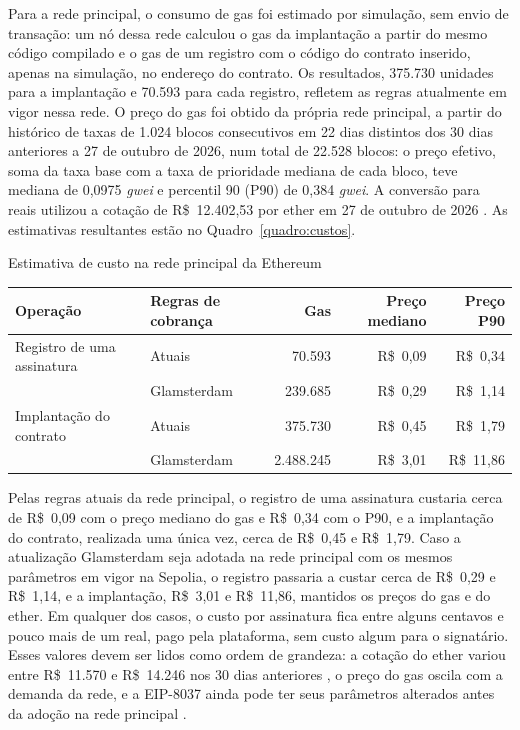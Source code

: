 \documentclass[
    12pt,
    a4paper,
    oneside,
    chapter=TITLE,
    section=TITLE,
    subsection=TITLE,
    subsubsection=TITLE,
    sumario=tradicional,
    english,
    brazil
]{abntex2}
\begin{document}
Para a rede principal, o consumo de gas foi estimado por simulação, sem envio de transação: um nó dessa rede calculou o gas da implantação a partir do mesmo código compilado e o gas de um registro com o código do contrato inserido, apenas na simulação, no endereço do contrato. Os resultados, 375.730 unidades para a implantação e 70.593 para cada registro, refletem as regras atualmente em vigor nessa rede. O preço do gas foi obtido da própria rede principal, a partir do histórico de taxas de 1.024 blocos consecutivos em 22 dias distintos dos 30 dias anteriores a 27 de outubro de 2026, num total de 22.528 blocos: o preço efetivo, soma da taxa base com a taxa de prioridade mediana de cada bloco, teve mediana de 0,0975 \emph{gwei} e percentil 90 (P90) de 0,384 \emph{gwei}. A conversão para reais utilizou a cotação de R\$~12.402,53 por ether em 27 de outubro de 2026 \cite{coingecko2026}. As estimativas resultantes estão no Quadro~\ref{quadro:custos}.

\begin{quadro}[htb]
    \caption{Estimativa de custo na rede principal da Ethereum}
    \label{quadro:custos}
    \centering
    \small
    \begin{tabular}{L{3.6cm}L{2.6cm}rrr}
        \toprule
        \textbf{Operação} & \textbf{Regras de cobrança} & \textbf{Gas} & \textbf{Preço mediano} & \textbf{Preço P90} \\
        \midrule
        Registro de uma assinatura & Atuais & 70.593 & R\$~0,09 & R\$~0,34 \\
         & Glamsterdam & 239.685 & R\$~0,29 & R\$~1,14 \\
        \midrule
        Implantação do contrato & Atuais & 375.730 & R\$~0,45 & R\$~1,79 \\
         & Glamsterdam & 2.488.245 & R\$~3,01 & R\$~11,86 \\
        \bottomrule
    \end{tabular}
\end{quadro}

Pelas regras atuais da rede principal, o registro de uma assinatura custaria cerca de R\$~0,09 com o preço mediano do gas e R\$~0,34 com o P90, e a implantação do contrato, realizada uma única vez, cerca de R\$~0,45 e R\$~1,79. Caso a atualização Glamsterdam seja adotada na rede principal com os mesmos parâmetros em vigor na Sepolia, o registro passaria a custar cerca de R\$~0,29 e R\$~1,14, e a implantação, R\$~3,01 e R\$~11,86, mantidos os preços do gas e do ether. Em qualquer dos casos, o custo por assinatura fica entre alguns centavos e pouco mais de um real, pago pela plataforma, sem custo algum para o signatário. Esses valores devem ser lidos como ordem de grandeza: a cotação do ether variou entre R\$~11.570 e R\$~14.246 nos 30 dias anteriores \cite{coingecko2026}, o preço do gas oscila com a demanda da rede, e a EIP-8037 ainda pode ter seus parâmetros alterados antes da adoção na rede principal \cite{silva2025}.
\end{document}
